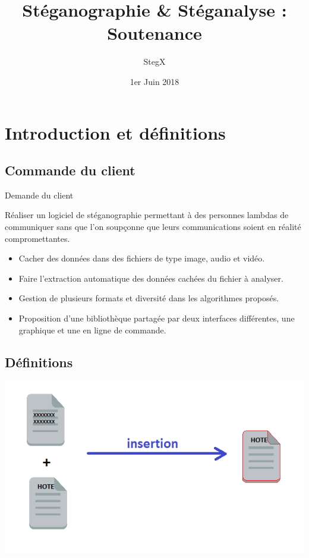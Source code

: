 \documentclass{beamer}
\title{Stéganographie \& Stéganalyse : Soutenance}
\author{StegX}
\institute{UFR des Sciences Versailles - L3 Informatique}
\date{1er Juin 2018}
\begin{document}
  \begin{frame}
  \titlepage
  \end{frame}
  
  \section{Introduction et définitions}
  
    \subsection{Commande du client}
  
  \begin{frame}
   \begin{block}{Demande du client}
   
	Réaliser un logiciel de stéganographie permettant à des
	personnes lambdas de communiquer sans que l'on soupçonne que leurs
	communications soient en réalité compromettantes. 
   
	\begin{itemize}
	[circle]
    \item Cacher des données dans des fichiers
        de type image, audio et vidéo. 
    \item Faire l'extraction automatique des données cachées du 
        fichier à analyser.
    \item Gestion de plusieurs formats et diversité dans les algorithmes proposés.
    \item Proposition d'une bibliothèque partagée par
        deux interfaces différentes, une graphique et une en ligne de commande.
	\end{itemize}
	\end{block}

  \end{frame}
  
  
  \subsection{Définitions}
  
  \begin{frame}
  \hspace{5cm}
  \includegraphics[scale=0.7]{pictures/definition1.png}
  \end{frame}
  
\end{document}
